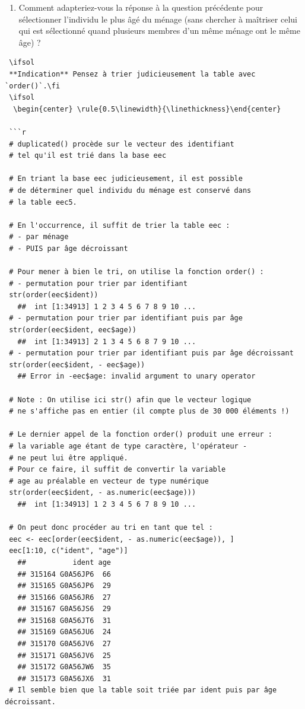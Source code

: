 \documentclass[12pt,twosided, notitlepage]{book}
\newif \ifsol
\begin{document}
\begin{enumerate}
\begin{enumerate}
    \begin{center} \rule{0.5\linewidth}{\linethickness}\end{center} 
     \bigskip 
     \fi
  \item
    Comment adapteriez-vous la réponse à la question précédente pour
    sélectionner l'individu le plus âgé du ménage (sans chercher à
    maîtriser celui qui est sélectionné quand plusieurs membres d'un
    même ménage ont le même âge) ?
  \end{enumerate}

\begin{verbatim}
 \ifsol 
 **Indication** Pensez à trier judicieusement la table avec `order()`.\fi 
 \ifsol 
  \begin{center} \rule{0.5\linewidth}{\linethickness}\end{center} 

 ```r
 # duplicated() procède sur le vecteur des identifiant
 # tel qu'il est trié dans la base eec

 # En triant la base eec judicieusement, il est possible
 # de déterminer quel individu du ménage est conservé dans
 # la table eec5.

 # En l'occurrence, il suffit de trier la table eec :
 # - par ménage
 # - PUIS par âge décroissant

 # Pour mener à bien le tri, on utilise la fonction order() : 
 # - permutation pour trier par identifiant
 str(order(eec$ident))
   ##  int [1:34913] 1 2 3 4 5 6 7 8 9 10 ...
 # - permutation pour trier par identifiant puis par âge
 str(order(eec$ident, eec$age))
   ##  int [1:34913] 2 1 3 4 5 6 8 7 9 10 ...
 # - permutation pour trier par identifiant puis par âge décroissant
 str(order(eec$ident, - eec$age))
   ## Error in -eec$age: invalid argument to unary operator

 # Note : On utilise ici str() afin que le vecteur logique
 # ne s'affiche pas en entier (il compte plus de 30 000 éléments !)

 # Le dernier appel de la fonction order() produit une erreur : 
 # la variable age étant de type caractère, l'opérateur -
 # ne peut lui être appliqué. 
 # Pour ce faire, il suffit de convertir la variable 
 # age au préalable en vecteur de type numérique
 str(order(eec$ident, - as.numeric(eec$age)))
   ##  int [1:34913] 1 2 3 4 5 6 7 8 9 10 ...

 # On peut donc procéder au tri en tant que tel :
 eec <- eec[order(eec$ident, - as.numeric(eec$age)), ]
 eec[1:10, c("ident", "age")]
   ##           ident age
   ## 315164 G0A56JP6  66
   ## 315165 G0A56JP6  29
   ## 315166 G0A56JR6  27
   ## 315167 G0A56JS6  29
   ## 315168 G0A56JT6  31
   ## 315169 G0A56JU6  24
   ## 315170 G0A56JV6  27
   ## 315171 G0A56JV6  25
   ## 315172 G0A56JW6  35
   ## 315173 G0A56JX6  31
 # Il semble bien que la table soit triée par ident puis par âge décroissant.


\end{verbatim}
\end{enumerate}
\end{document}
